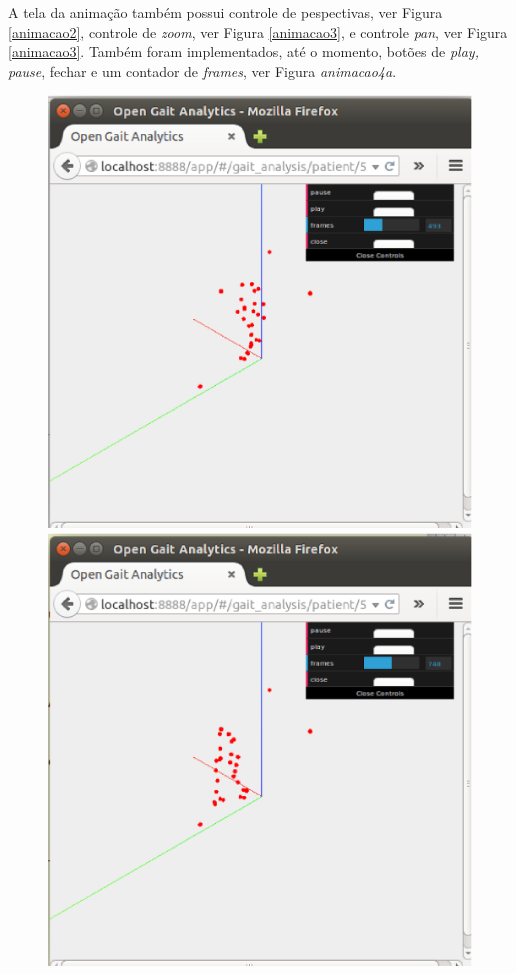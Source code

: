 A tela da animação também possui controle de pespectivas, ver Figura \ref{animacao2}, controle de \emph{zoom}, ver Figura \ref{animacao3}, e controle \emph{pan}, ver Figura \ref{animacao3}.
Também foram implementados, até o momento, botões de \emph{play, pause}, fechar e um contador de \emph{frames}, ver Figura \emph{animacao4a}.


\begin{figure}[ht]
  \centering
  \begin{minipage}[b]{0.32\textwidth}
    \includegraphics[width=\textwidth]{figuras/tela8.eps}
  \end{minipage}
  \hfill
  \begin{minipage}[b]{0.32\textwidth}
    \includegraphics[width=\textwidth]{figuras/tela9.eps}

\end{minipage}
\end{figure}
